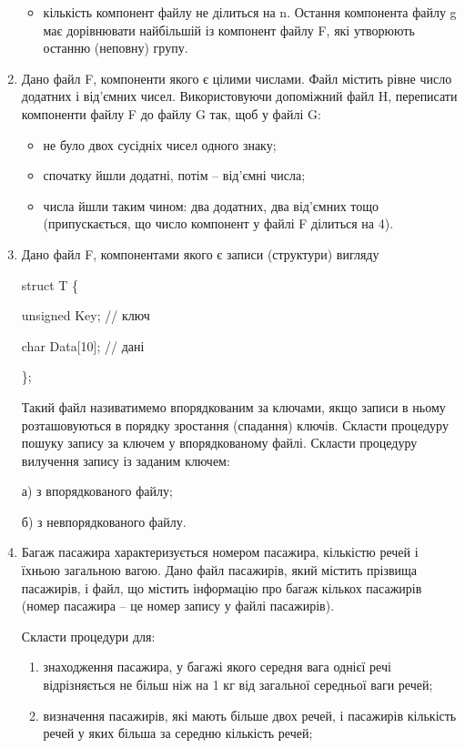 \documentclass[]{article}
\makeatletter
\newcommand{\xslalph}[1]{\expandafter\@xslalph\csname c@#1\endcsname}
\newcommand{\@xslalph}[1]{%
    \ifcase#1\or а\or б\or в\or г\or д\or e\or є\or ж\or з\or i%
    \or й\or к\or л\or м\or н\or о\or п\or р\or с\or т%
    \or у\or ф\or х\or ц\or ч\or ш\or ю\or я\or аа\or бб\or вв %
    \else\@ctrerr\fi%
}
\makeatother
\begin{document}
\begin{enumerate}
\begin{itemize}
\item кількість компонент файлу не ділиться на n. Остання компонента файлу
g має дорівнювати найбільшій із компонент файлу F, які утворюють останню
(неповну) групу.
\end{itemize}
\item
Дано файл F, компоненти якого є цілими числами. Файл містить рівне число
додатних і від'ємних чисел. Використовуючи допоміжний файл H, переписати
компоненти файлу F до файлу G так, щоб у файлі G:
\begin{itemize}
\item не було двох сусідніх чисел одного знаку;

\item спочатку йшли додатні, потім -- від'ємні числа;
\item числа йшли таким чином: два додатних, два від'ємних тощо 
(припускається, що число компонент у файлі F ділиться на 4).
\end{itemize}

\item
Дано файл F, компонентами якого є записи (структури) вигляду

struct T \{

unsigned Key; // ключ

char Data{[}10{]}; // дані

\};

Такий файл називатимемо впорядкованим за ключами, якщо записи в ньому
розташовуються в порядку зростання (спадання) ключів. Скласти процедуру
пошуку запису за ключем у впорядкованому файлі. Скласти процедуру
вилучення запису із заданим ключем:

а) з впорядкованого файлу;

б) з невпорядкованого файлу.
\item
Багаж пасажира характеризується номером пасажира, кількістю речей і
їхньою загальною вагою. Дано файл пасажирів, який містить прізвища
пасажирів, і файл, що містить інформацію про багаж кількох пасажирів
(номер пасажира -- це номер запису у файлі пасажирів).

Скласти процедури для:
\begin{enumerate}[label=\xslalph*)]
\item
 знаходження пасажира, у багажі якого середня вага однієї речі 
відрізняється не більш ніж на 1 кг від загальної середньої ваги речей;

\item визначення пасажирів, які мають більше двох речей, і пасажирів
кількість речей у яких більша за середню кількість речей;


\end{enumerate}
\end{enumerate}
\end{document}
